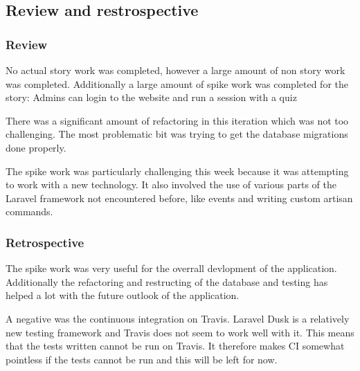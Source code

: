 \subsection{Review and restrospective}
\subsubsection{Review}
No actual story work was completed, however a large amount of non story work was completed. Additionally a large amount of spike work was completed for the story: Admins can login to the website and run a session with a quiz

There was a significant amount of refactoring in this iteration which was not too challenging. The most problematic bit was trying to get the database migrations done properly.

The spike work was particularly challenging this week because it was attempting to work with a new technology. It also involved the use of various parts of the Laravel framework not encountered before, like events and writing custom artisan commands.

\subsubsection{Retrospective}
The spike work was very useful for the overrall devlopment of the application. Additionally the refactoring and restructing of the database and testing has helped a lot with the future outlook of the application.

A negative was the continuous integration on Travis. Laravel Dusk is a relatively new testing framework and Travis does not seem to work well with it. This means that the tests written cannot be run on Travis. It therefore makes CI somewhat pointless if the tests cannot be run and this will be left for now.
\newpage
